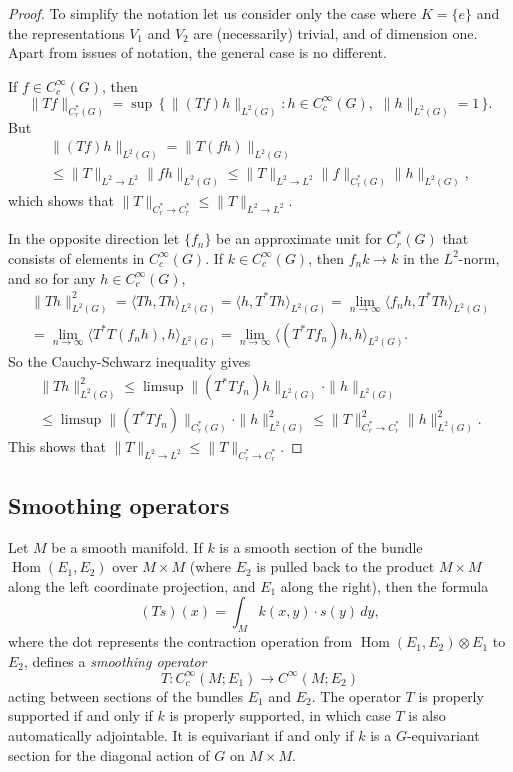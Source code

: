 \documentclass[leqno,11pt]{amsart}
\numberwithin{equation}{subsection}
\theoremstyle{plain}
\theoremstyle{definition}
\theoremstyle{remark}
\DeclareMathOperator{\Hom}{Hom}
\begin{document}
\begin{proof} 
To simplify the notation let us consider only the case where $K =\{ e\}$ and the representations $V_1$ and $V_2$ are (necessarily) trivial, and of dimension one.  Apart from issues of notation, the general case is no different.

If $f\in C_c^\infty (G)$, then 
\[
\| Tf \|_{C^*_r (G)} = 
\sup \, \bigl \{ \, \| (Tf)h\| _{L^2(G)} : h\in C_c^\infty (G),\,\, \| h\|_{L^2 (G)}=1\,\bigr \} .
\]
But 
\begin{multline*}
\| (Tf)h\| _{L^2(G)} = \| T(fh)\| _{L^2(G)} 
\\
 \le \|T\|_{L^2 \to L^2} \|fh\|_{L^2(G)} \le 
\|T\|_{L^2 \to L^2} \|f\|_{C^*_r (G)}\|h \|_{L^2(G)},
\end{multline*}
which shows that  $\|T\|_{C^*_r \to C^*_r }\le\|T\|_{L^2 \to L^2} $.

In the opposite direction let $\{f_n\}$ be an approximate unit for $C^*_r(G)$ that consists of elements in $C^\infty _c(G)$.
If $k\in C_c^\infty(G)$, then $f_n k \to k$ in the $L^2$-norm, and so for any $h\in C_c^\infty (G)$, 
\begin{multline*}
\| Th \|_{L^2(G)}^2 =
\bigl \langle Th , Th \bigr \rangle_{L^2 (G)}  
=
\bigl \langle  h , T^*Th \bigr \rangle_{L^2 (G)}  
= 
\lim_{n\to \infty}\bigl \langle  f_n h , T^*Th \bigr \rangle_{L^2 (G)} 
\\
=
\lim_{n\to \infty}\bigl \langle  T^*T (f_n h) , h \bigr \rangle_{L^2 (G)}  
=
\lim_{n\to \infty}\bigl \langle  (T^*T f_n) h , h \bigr \rangle_{L^2 (G)}  .
\end{multline*}
So the Cauchy-Schwarz inequality gives 
\begin{multline*}
\| Th \|_{L^2(G)}^2 
\le \limsup \| (T^*T f_n) h\|  _{L^2(G)} \cdot \|  h\|  _{L^2(G)}
\\
\le \limsup \| (T^*T f_n)\|  _{C^*_r(G)}\cdot \|  h\|^2 _{L^2(G)}  
\le \|T\|^2 _{C^*_r \to C^*_r} \| h\|^2 _{L^2 (G)}.
\end{multline*}
This shows that $\|T\|_{L^2 \to L^2} \le \|T\|_{C^*_r \to C^*_r } $.
\end{proof} 

\subsection{Smoothing operators}
\label{subsec-smoothing-operators}
Let $M$ be a smooth manifold. If $k$ is a smooth section of the bundle $\Hom (E_1,  E_2)$ over $M\times M$ (where $E_2$ is pulled back to the product $M\times M$ along the left coordinate projection, and $E_1$ along the right), then the formula 
\[
(T s)(x) = \int _M   k(x,y)\cdot s(y) \, dy ,
\]
where the dot represents the contraction operation from $\Hom (E_1,E_2)\otimes E_1$ to $E_2$, defines a \emph{smoothing operator}
\[
T \colon C_c^\infty (M;E_1) \longrightarrow C^\infty (M;E_2)
\]
acting between sections of the bundles $E_1$ and $E_2$.  The operator $T$ is properly supported if and only if $k$ is properly supported, in which case $T$ is also automatically adjointable.  It is equivariant if and only if $k$ is a $G$-equivariant section for the diagonal action of $G$ on $M\times M$.
\end{document}
